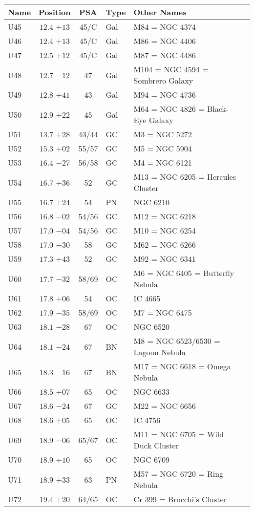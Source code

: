 \begin{table}[p]
\setlength{\tabcolsep}{3pt}
\small
\begin{tabular}{lcclll}
\hline
Name&Position&PSA&Type&Other Names\\
\hline
U45 &$12.4$ $+13$&45/C&Gal&M84 = NGC 4374\\
U46 &$12.4$ $+13$&45/C&Gal&M86 = NGC 4406\\
U47 &$12.5$ $+12$&45/C&Gal&M87 = NGC 4486\\
U48 &$12.7$ $-12$&47&Gal&M104 = NGC 4594 = Sombrero Galaxy\\
U49 &$12.8$ $+41$&43&Gal&M94 = NGC 4736\\
U50 &$12.9$ $+22$&45&Gal&M64 = NGC 4826 = Black-Eye Galaxy\\
U51 &$13.7$ $+28$&43/44&GC &M3 = NGC 5272\\
U52 &$15.3$ $+02$&55/57&GC &M5 = NGC 5904\\
U53 &$16.4$ $-27$&56/58&GC &M4 = NGC 6121\\
U54 &$16.7$ $+36$&52&GC &M13 = NGC 6205 = Hercules Cluster\\
U55 &$16.7$ $+24$&54&PN &NGC 6210\\
U56 &$16.8$ $-02$&54/56&GC &M12 = NGC 6218\\
U57 &$17.0$ $-04$&54/56&GC &M10 = NGC 6254\\
U58 &$17.0$ $-30$&58&GC &M62 = NGC 6266\\
U59 &$17.3$ $+43$&52&GC &M92 = NGC 6341\\
U60 &$17.7$ $-32$&58/69&OC &M6 = NGC 6405 = Butterfly Nebula\\
U61 &$17.8$ $+06$&54&OC &IC 4665\\
U62 &$17.9$ $-35$&58/69&OC &M7 = NGC 6475\\
U63 &$18.1$ $-28$&67&OC &NGC 6520\\
U64 &$18.1$ $-24$&67&BN &M8 = NGC 6523/6530 = Lagoon Nebula\\
U65 &$18.3$ $-16$&67&BN &M17 = NGC 6618 = Omega Nebula\\
U66 &$18.5$ $+07$&65&OC &NGC 6633\\
U67 &$18.6$ $-24$&67&GC &M22 = NGC 6656\\
U68 &$18.6$ $+05$&65&OC &IC 4756\\
U69 &$18.9$ $-06$&65/67&OC &M11 = NGC 6705 = Wild Duck Cluster\\
U70 &$18.9$ $+10$&65&OC &NGC 6709\\
U71 &$18.9$ $+33$&63&PN &M57 = NGC 6720 = Ring Nebula\\
U72 &$19.4$ $+20$&64/65&OC &Cr 399 = Brocchi's Cluster\\

\end{tabular}
\end{table}
